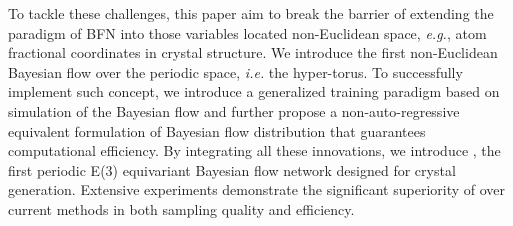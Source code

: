 

To tackle these challenges, this paper aim to break the barrier of extending the paradigm of BFN into those variables located non-Euclidean space, \textit{e.g.}, atom fractional coordinates in crystal structure. We introduce the first non-Euclidean Bayesian flow over the periodic space, \textit{i.e.} the hyper-torus. To successfully implement such concept, we introduce a generalized training paradigm based on simulation of the Bayesian flow and further propose a non-auto-regressive equivalent formulation of Bayesian flow distribution that guarantees computational efficiency. By integrating all these innovations, we introduce \modelname, the first periodic E(3) equivariant Bayesian flow network designed for crystal generation. Extensive experiments demonstrate the significant superiority of \modelname over current methods in both sampling quality and efficiency.

